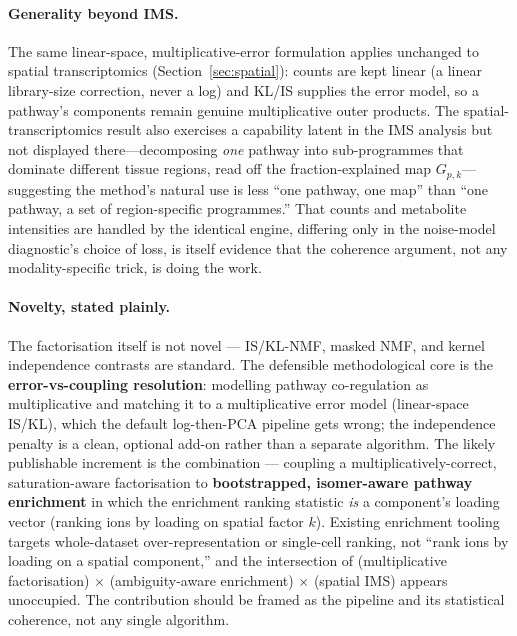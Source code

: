 \documentclass[11pt]{article}
\begin{document}
\paragraph{Generality beyond IMS.} The same linear-space, multiplicative-error formulation
applies unchanged to spatial transcriptomics (Section~\ref{sec:spatial}): counts are kept
linear (a linear library-size correction, never a log) and KL/IS supplies the error model,
so a pathway's components remain genuine multiplicative outer products. The
spatial-transcriptomics result also exercises a capability latent in the IMS analysis but
not displayed there---decomposing \emph{one} pathway into sub-programmes that dominate
different tissue regions, read off the fraction-explained map $G_{p,k}$---suggesting the
method's natural use is less ``one pathway, one map'' than ``one pathway, a set of
region-specific programmes.'' That counts and metabolite intensities are handled by the
identical engine, differing only in the noise-model diagnostic's choice of loss, is itself
evidence that the coherence argument, not any modality-specific trick, is doing the work.

\paragraph{Novelty, stated plainly.} The factorisation itself is not novel --- IS/KL-NMF,
masked NMF, and kernel independence contrasts are standard. The defensible methodological
core is the \textbf{error-vs-coupling resolution}: modelling pathway co-regulation as
multiplicative and matching it to a multiplicative error model (linear-space IS/KL), which
the default log-then-PCA pipeline gets wrong; the independence penalty is a clean, optional
add-on rather than a separate algorithm. The likely publishable increment is the combination
--- coupling a multiplicatively-correct, saturation-aware factorisation to
\textbf{bootstrapped, isomer-aware pathway enrichment} in which the enrichment ranking
statistic \emph{is} a component's loading vector (ranking ions by loading on spatial factor
$k$). Existing enrichment tooling targets whole-dataset over-representation or single-cell
ranking, not ``rank ions by loading on a spatial component,'' and the intersection of
(multiplicative factorisation) $\times$ (ambiguity-aware enrichment) $\times$ (spatial IMS)
appears unoccupied. The contribution should be framed as the pipeline and its statistical
coherence, not any single algorithm.
\end{document}
